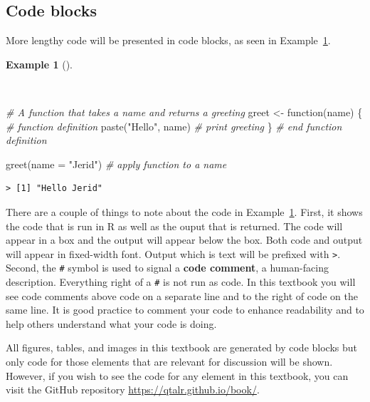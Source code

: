 \documentclass[
  letterpaper,
  DIV=11,
  numbers=noendperiod]{scrreport}
\newenvironment{Shaded}{\begin{snugshade}}{\end{snugshade}}
\newcommand{\AttributeTok}[1]{\textcolor[rgb]{0.00,0.00,0.00}{#1}}
\newcommand{\CommentTok}[1]{\textcolor[rgb]{0.00,0.00,0.00}{\textit{#1}}}
\newcommand{\ControlFlowTok}[1]{\textcolor[rgb]{0.00,0.00,0.00}{#1}}
\newcommand{\FunctionTok}[1]{\textcolor[rgb]{0.00,0.00,0.00}{#1}}
\newcommand{\NormalTok}[1]{\textcolor[rgb]{0.00,0.00,0.00}{#1}}
\newcommand{\OtherTok}[1]{\textcolor[rgb]{0.00,0.00,0.00}{#1}}
\newcommand{\StringTok}[1]{\textcolor[rgb]{0.00,0.00,0.00}{#1}}
\theoremstyle{definition}
\newtheorem{example}{Example}[chapter]
\theoremstyle{remark}
\begin{document}
\hypertarget{sec-p-code-blocks}{%
\subsection*{Code blocks}\label{sec-p-code-blocks}}

More lengthy code will be presented in code blocks, as seen in
Example~\ref{exm-code-block}.

\begin{example}[]\protect\hypertarget{exm-code-block}{}\label{exm-code-block}

~

\begin{Shaded}
\begin{Highlighting}[]
\CommentTok{\# A function that takes a name and returns a greeting}
\NormalTok{greet }\OtherTok{\textless{}{-}} \ControlFlowTok{function}\NormalTok{(name) \{ }\CommentTok{\# function definition}
  \FunctionTok{paste}\NormalTok{(}\StringTok{"Hello"}\NormalTok{, name) }\CommentTok{\# print greeting}
\NormalTok{\} }\CommentTok{\# end function definition}

\FunctionTok{greet}\NormalTok{(}\AttributeTok{name =} \StringTok{"Jerid"}\NormalTok{) }\CommentTok{\# apply function to a name}
\end{Highlighting}
\end{Shaded}

\begin{verbatim}
> [1] "Hello Jerid"
\end{verbatim}

\end{example}

There are a couple of things to note about the code in
Example~\ref{exm-code-block}. First, it shows the code that is run in R
as well as the ouput that is returned. The code will appear in a box and
the output will appear below the box. Both code and output will appear
in fixed-width font. Output which is text will be prefixed with
\texttt{\textgreater{}}. Second, the \texttt{\#} symbol is used to
signal a \textbf{code comment}, a human-facing description. Everything
right of a \texttt{\#} is not run as code. In this textbook you will see
code comments above code on a separate line and to the right of code on
the same line. It is good practice to comment your code to enhance
readability and to help others understand what your code is doing.

All figures, tables, and images in this textbook are generated by code
blocks but only code for those elements that are relevant for discussion
will be shown. However, if you wish to see the code for any element in
this textbook, you can visit the GitHub repository
\url{https://qtalr.github.io/book/}.
\end{document}
